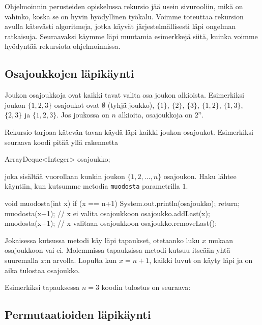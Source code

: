 Ohjelmoinnin perusteiden opiskelussa rekursio jää usein sivurooliin,
mikä on vahinko, koska se on hyvin hyödyllinen työkalu.
Voimme toteuttaa rekursion avulla kätevästi algoritmeja,
jotka käyvät järjestelmällisesti läpi ongelman ratkaisuja.
Seuraavaksi käymme läpi muutamia esimerkkejä siitä,
kuinka voimme hyödyntää rekursiota ohjelmoinnissa.

\subsection{Osajoukkojen läpikäynti}

Joukon osajoukkoja ovat kaikki tavat valita osa joukon alkioista.
Esimerkiksi joukon $\{1,2,3\}$ osajoukot ovat
$\emptyset$ (tyhjä joukko), $\{1\}$, $\{2\}$, $\{3\}$,
$\{1,2\}$, $\{1,3\}$, $\{2,3\}$ ja $\{1,2,3\}$.
Jos joukossa on $n$ alkioita, osajoukkoja on $2^n$.

Rekursio tarjoaa kätevän tavan käydä läpi kaikki
joukon osajoukot. Esimerkiksi seuraava koodi pitää yllä
rakennetta

\begin{code}
ArrayDeque<Integer> osajoukko;
\end{code}

joka sisältää vuorollaan kunkin joukon $\{1,2,\dots,n\}$
osajoukon.
Haku läh\-tee käyntiin, kun kutsumme metodia \texttt{muodosta}
parametrilla $1$.

\begin{code}
void muodosta(int x) {
    if (x == n+1) {
        System.out.println(osajoukko);
        return;
    }
    muodosta(x+1); // x ei valita osajoukkoon
    osajoukko.addLast(x);
    muodosta(x+1); // x valitaan osajoukkoon
    osajoukko.removeLast();
}
\end{code}

Jokaisessa kutsussa metodi käy läpi tapaukset,
otetaanko luku $x$ mukaan osajoukkoon vai ei.
Molemmissa tapauksissa metodi kutsuu itseään yhtä
suuremalla $x$:n arvolla.
Lopulta kun $x=n+1$, kaikki luvut on käyty läpi
ja on aika tulostaa osajoukko.

Esimerkiksi tapauksessa $n=3$ koodin tulostus on seuraava:

\begin{code}
[]
[3]
[2]
[2, 3]
[1]
[1, 3]
[1, 2]
[1, 2, 3]
\end{code}

\subsection{Permutaatioiden läpikäynti}

